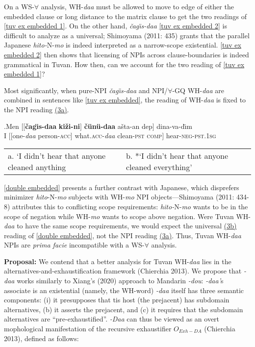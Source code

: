 \documentclass[11pt]{article}
\newcommand{\changis}{\v{c}a\textipa{N}g\"{\i}s}
\begin{document}
On a WS-$\forall$ analysis, WH-\textit{daa} must be allowed to move to edge of either the embedded clause or long distance to the matrix clause to get the two readings of \ref{tuv ex embedded 1}. On the other hand, \textit{\changis-daa} \ref{tuv ex embedded 2} is difficult to analyze as a universal; Shimoyama (2011: 435) grants that the parallel Japanese \textit{hito-}N-\textit{mo} is indeed interpreted as a narrow-scope existential.  \ref{tuv ex embedded 2} then shows that licensing of NPIs across clause-boundaries is indeed grammatical in Tuvan.  How then, can we account for the two reading of \ref{tuv ex embedded 1}?

Most significantly, when pure-NPI \textit{\changis-daa} and NPI/$\forall$-GQ WH-\textit{daa} are combined in sentences like \ref{tuv ex embedded}, the reading of WH-\textit{daa} is fixed to the NPI reading \hyperref[double embedded]{(3a)}.

\vspace{-8pt}
\exg.\label{double embedded}Men $[[$\textbf{\changis-daa} \textbf{ki\v{z}i-ni}$]$ \textbf{\v{c}\"{u}n\"{u}-daa} a\v{s}ta-an dep$]$ dina-va-d\"{\i}m\\
I $[[$one-\textit{daa} person-\textsc{acc}$]$ what.\textsc{acc}-\textit{daa} clean-\textsc{pst} \textsc{comp}$]$ hear-\textsc{neg-pst.1sg}\\
\hspace{-7pt}\begin{tabular}[t]{ll}
   a. `I didn't hear that anyone cleaned anything  & b. *`I didn't hear that anyone cleaned everything'\\
\end{tabular}
\vspace{-8pt}


{\ref{double embedded}} presents a further contrast with Japanese, which disprefers minimizer \textit{hito}-N-\textit{mo} subjects with WH-\textit{mo} NPI objects---Shimoyama (2011: 434-8) attributes this to conflicting scope requirements: \textit{hito-}N-\textit{mo} wants to be in the scope of negation while WH-\textit{mo} wants to scope above negation.  Were Tuvan WH-\textit{daa} to have the same scope requirements, we would expect the universal \hyperref[double embedded]{(3b)} reading of \ref{double embedded}, not the NPI reading \hyperref[double embedded]{(3a)}.  Thus, Tuvan WH-\textit{daa} NPIs are \textit{prima facie} incompatible with a WS-$\forall$ analysis.

\noindent\textbf{Proposal: } We contend that a better analysis for Tuvan WH-\textit{daa} lies in the alternatives-and-exhaustification framework (Chierchia 2013).  We propose that \textit{-daa} works similarly to Xiang's (2020) approach to Mandarin \textit{-dou}: \textit{-daa'}s associate is an existential (namely, the WH-word) \textit{-daa} itself has three semantic components: (i) it presupposes that tis host (the prejacent) has subdomain alternatives, (b) it asserts the prejacent, and (c) it requires that the subdomain alternatives are ``pre-exhaustified''.  \textit{-Daa} can thus be viewed as an overt mophological manifestation of the recursive exhaustifier $O_{Exh-DA}$ (Chierchia 2013), defined as follows:
\end{document}
